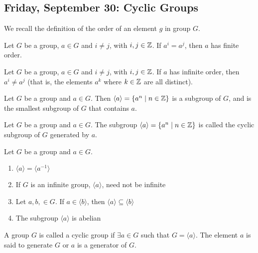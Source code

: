 \subsection{Friday, September 30: Cyclic Groups}

We recall the definition of the order of an element $g$ in group $G$.

\begin{theorem}
    Let $G$ be a group, $a \in G$ and $i \neq j$, with $i, j \in \mathbb{Z}$. If $a^i = a^j$, then $a$ has finite order.
\end{theorem}

\begin{remark}
    Let $G$ be a group, $a \in G$ and $i \neq j$, with $i, j \in \mathbb{Z}$. If $a$ has infinite order, then $a^i \neq a^j$ (that is, the elements $a^k$ where $k \in \mathbb{Z}$ are all distinct).
\end{remark}

\begin{theorem}
    Let $G$ be a group and $a \in G$. Then $\langle a \rangle = \qty{a^n \mid n \in \mathbb{Z}}$ is a subgroup of $G$, and is the smallest subgroup of $G$ that contains $a$.
\end{theorem}

\begin{definition}
    Let $G$ be a group and $a \in G$. The subgroup $\langle a \rangle = \qty{a^n \mid n \in \mathbb{Z}}$ is called the cyclic subgroup of $G$ generated by $a$.
\end{definition}

\begin{remark}
    Let $G$ be a group and $a \in G$. \\
    \begin{enumerate}
        \item $\langle a \rangle = \langle a^{-1} \rangle$
        \item If $G$ is an infinite group, $\langle a \rangle$, need not be infinite
        \item Let $a, b, \in G$. If $a \in \langle b \rangle$, then $\langle a  \rangle \subseteq \langle b \rangle$
        \item The subgroup $\langle a \rangle$ is abelian
    \end{enumerate}
\end{remark}

\begin{definition}
    A group $G$ is called a cyclic group if $\exists a \in G$ such that $G = \langle a \rangle$. The element $a$ is said to generate $G$ or $a$ is a generator of $G$.
\end{definition}

